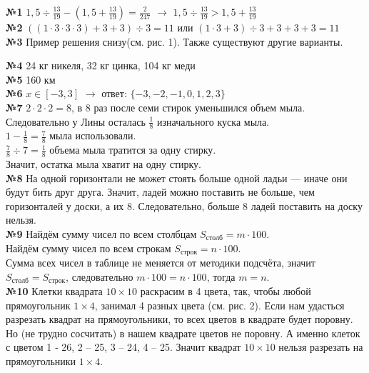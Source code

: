 \documentclass[12 pt, a4paper]{article}%
\newcommand{\task}[1]{{{\vspace{0.6cm} \vspace{-2ex} \textbf{№{#1}} }}}
\begin{document}
	\task{1} $1,5 \div \frac{13}{19} - (1,5 + \frac{13}{19}) = \frac{2}{247}$  $\longrightarrow$ $1,5 \div \frac{13}{19} > 1,5 + \frac{13}{19}$\\
	
	\task{2}$((1 \cdot 3 \cdot 3 \cdot 3) + 3 + 3) \div 3 = 11$ или $(1 \cdot 3 + 3) \div 3 + 3 + 3 + 3 = 11$ \\
	
	\task{3}  Пример решения снизу(см. рис. 1). Также существуют другие варианты.

	\task{4} 24 кг никеля, 32 кг цинка, 104 кг меди\\
	
	\task{5} 160 км	\\
	
	\task{6} $x \in [-3, 3]$ $\longrightarrow$ ответ: $\{-3, -2, -1, 0, 1, 2, 3\}$\\
	
	\task{7} $2 \cdot 2 \cdot 2 = 8$, в 8 раз после семи стирок уменьшился объем мыла.\\
	Следовательно у Лины осталась $\frac{1}{8}$ изначального куска мыла.\\
	$1 - \frac{1}{8} = \frac{7}{8}$ мыла использовали.\\
	$\frac{7}{8} \div 7 = \frac{1}{8}$ объема мыла тратится за одну стирку.\\
	Значит, остатка мыла хватит на одну стирку.\\
	
	\task{8} На одной горизонтали не может стоять больше одной ладьи — иначе они будут бить друг друга. Значит, ладей можно поставить не больше, чем горизонталей у доски, а их 8. Следовательно, больше 8 ладей поставить на доску нельзя.\\
	
	\task{9} Найдём сумму чисел по всем столбцам $S_{столб} = m \cdot 100$.\\
	Найдём сумму чисел по всем строкам $S_{строк} = n \cdot 100$.\\
	Сумма всех чисел в таблице не меняется от методики подсчёта, значит $S_{столб} = S_{строк}$, следовательно $m \cdot 100 = n \cdot 100$, тогда $m = n$.\\
	
	\task{10} Клетки квадрата $10 \times 10$ раскрасим в 4 цвета, так, чтобы любой прямоугольник $1 \times 4$, занимал 4 разных цвета (см. рис. 2). Если нам удасться разрезать квадрат на прямоугольники, то всех цветов в квадрате будет поровну. Но (не трудно сосчитать) в нашем квадрате цветов не поровну. А именно клеток с цветом 1 ‑ 26, 2 – 25, 3 – 24, 4 – 25. Значит квадрат $10 \times 10$ нельзя разрезать на прямоугольники $1 \times 4$.\\
	
\end{document}
